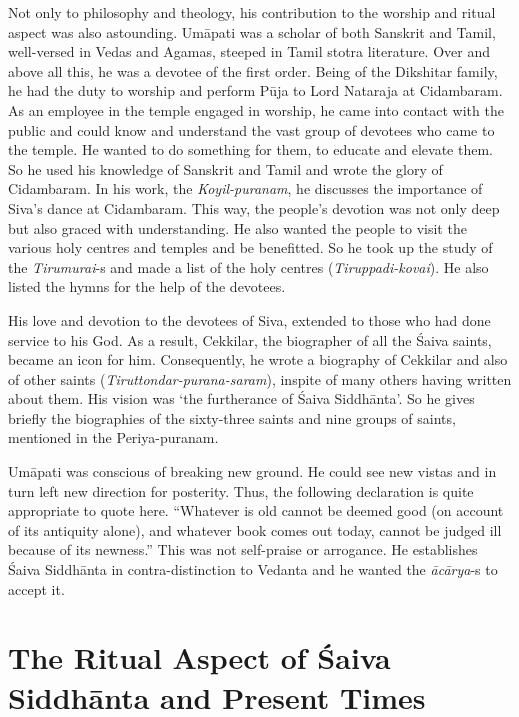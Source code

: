 Not only to philosophy and theology, his contribution to the worship and ritual aspect was also astounding. Umāpati was a scholar of both Sanskrit and Tamil, well-versed in Vedas and Agamas, steeped in Tamil stotra literature. Over and above all this, he was a devotee of the first order. Being of the Dikshitar family, he had the duty to worship and perform Pūja to Lord Nataraja at Cidambaram. As an employee in the temple engaged in worship, he came into contact with the public and could know and understand the vast group of devotees who came to the temple. He wanted to do something for them, to educate and elevate them. So he used his knowledge of Sanskrit and Tamil and wrote the glory of Cidambaram. In his work, the \textit{Koyil-puranam}, he discusses the importance of Siva’s dance at Cidambaram. This way, the people’s devotion was not only deep but also graced with understanding. He also wanted the people to visit the various holy centres and temples and be benefitted. So he took up the study of the \textit{Tirumurai}-s and made a list of the holy centres (\textit{Tiruppadi-kovai}). He also listed the hymns for the help of the devotees.

His love and devotion to the devotees of Siva, extended to those who had done service to his God. As a result, Cekkilar, the biographer of all the Śaiva saints, became an icon for him. Consequently, he wrote a biography of Cekkilar and also of other saints (\textit{Tiruttondar-purana-saram}), inspite of many others having written about them. His vision was ‘the furtherance of Śaiva Siddhānta’. So he gives briefly the biographies of the sixty-three saints and nine groups of saints, mentioned in the Periya-puranam.

Umāpati was conscious of breaking new ground. He could see new vistas and in turn left new direction for posterity. Thus, the following declaration is quite appropriate to quote here. “Whatever is old cannot be deemed good (on account of its antiquity alone), and whatever book comes out today, cannot be judged ill because of its newness.” This was not self-praise or arrogance. He establishes Śaiva Siddhānta in contra-distinction to Vedanta and he wanted the \textit{ācārya}-s to accept it.


\section*{The Ritual Aspect of Śaiva Siddhānta and Present Times}

